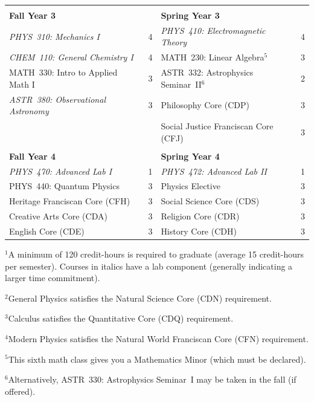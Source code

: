 \documentclass[12pt]{article}
\begin{document}
\begin{table}[h!]
\begin{center}
{\begin{tabular*}{0.9\textwidth}{@{\extracolsep{\fill}}lclc}
 & \\
{\Large \textbf{Fall Year 3}} & & {\Large \textbf{Spring Year 3}} & \\
\hline
{\em PHYS~310: Mechanics I}         & 4 & {\em PHYS~410: Electromagnetic Theory}  & 4 \\
{\em CHEM~110: General Chemistry I} & 4 & MATH~230: Linear Algebra$^{5}$    & 3 \\
MATH~330: Intro to Applied Math I   & 3 & ASTR~332: Astrophysics Seminar~II$^{6}$     & 2 \\
{\em ASTR~380: Observational Astronomy} & 3 & Philosophy Core (CDP)             & 3 \\
                                    &   & Social Justice Franciscan Core (CFJ) & 3 \\

& \\
{\Large \textbf{Fall Year 4}} & & {\Large \textbf{Spring Year 4}} & \\
\hline
{\em PHYS~470: Advanced Lab I} & 1 & {\em PHYS~472: Advanced Lab II}  & 1 \\
PHYS~440: Quantum Physics      & 3 & Physics Elective           & 3 \\
Heritage Franciscan Core (CFH) & 3 & Social Science Core (CDS)  & 3 \\
Creative Arts Core (CDA)       & 3 & Religion Core (CDR)        & 3 \\
English Core (CDE)             & 3 & History Core (CDH)         & 3 \\
\hline
\end{tabular*}
}
\end{center}
\end{table}

\vspace*{-4mm}
\hspace{0.1in}$^{1}$A minimum of 120 credit-hours is required to
graduate (average 15 credit-hours per semester).  \hspace*{0.42in}Courses in italics have a lab
component (generally indicating a larger time commitment). 

\hspace{0.1in}$^{2}$General Physics satisfies the Natural Science Core (CDN) requirement.

\hspace{0.1in}$^{3}$Calculus satisfies the Quantitative Core (CDQ) requirement.

\hspace{0.1in}$^{4}$Modern Physics satisfies the Natural World Franciscan Core
(CFN) requirement.

\hspace{0.1in}$^{5}$This sixth math class gives you a Mathematics Minor (which
must be declared).

\hspace{0.1in}$^{6}$Alternatively, ASTR~330: Astrophysics Seminar~I may be taken
in the fall (if offered).
\end{document}
